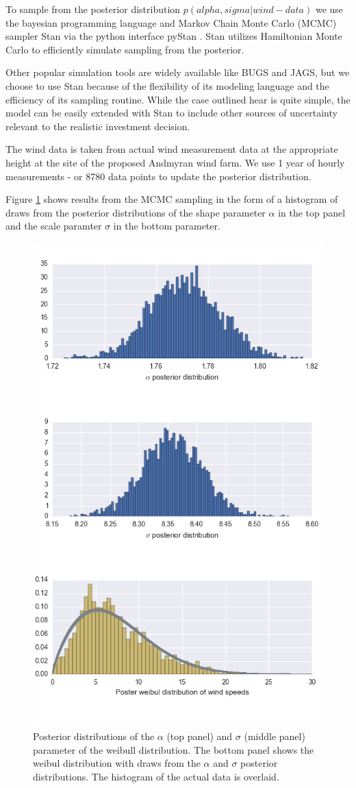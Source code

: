 \documentclass[11pt]{article}
\begin{document}
To sample from the posterior distribution $p(alpha, sigma|wind-data)$ we use the bayesian programming language and Markov Chain Monte Carlo (MCMC) sampler Stan via the python interface pyStan \citep{stan_development_team_pystan:_2014}. Stan utilizes Hamiltonian Monte Carlo to efficiently simulate sampling from the posterior. 

Other popular simulation tools are widely available like BUGS and JAGS, but we choose to use Stan because of the flexibility of its modeling language and the efficiency of its sampling routine. While the case outlined hear is quite simple, the model can be easily extended with Stan to include other sources of uncertainty relevant to the realistic investment decision.

The wind data is taken from actual wind measurement data at the appropriate height at the site of the proposed Andmyran wind farm. We use 1 year of hourly measurements - or 8780 data points to update the posterior distribution. 

Figure \ref{posteriors} shows results from the MCMC sampling in the form of a histogram of draws from the posterior distributions of the shape parameter $\alpha$ in the top panel and the scale paramter $\sigma$ in the bottom parameter.

\begin{figure}
	\centering
	\includegraphics[width=.6\textwidth]{figures/posteriors.png}
	\caption{Posterior distributions of the $\alpha$ (top panel) and $\sigma$ (middle panel) parameter of the weibull distribution. The bottom panel shows the weibul distribution with draws from the $\alpha$ and $\sigma$ posterior distributions. The histogram of the actual data is overlaid.}
	\label{posteriors}
\end{figure}
\end{document}
